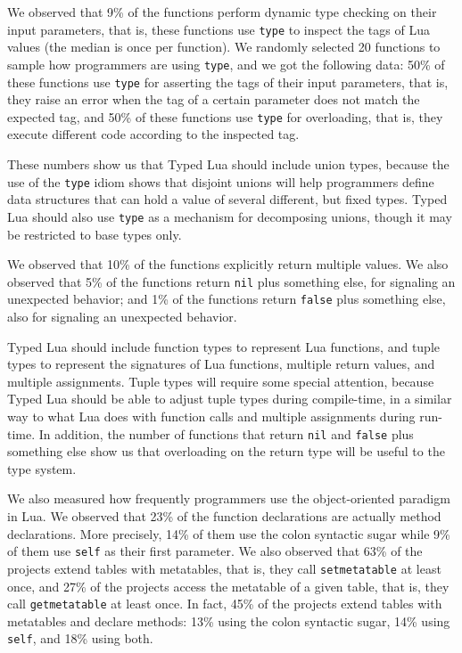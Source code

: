\documentclass[preprint]{sig-alternate}
\begin{document}
We observed that 9\% of the functions perform dynamic type checking
on their input parameters, that is, these functions use \texttt{type}
to inspect the tags of Lua values (the median is once per function).
We randomly selected 20 functions to sample how programmers are
using \texttt{type}, and we got the following data:
50\% of these functions use \texttt{type} for asserting the tags of
their input parameters, that is, they raise an error when the tag of a
certain parameter does not match the expected tag, and
50\% of these functions use \texttt{type} for overloading, that is,
they execute different code according to the inspected tag.

These numbers show us that Typed Lua should include union types,
because the use of the \texttt{type} idiom shows that disjoint unions
will help programmers define data structures that can hold a value of
several different, but fixed types.
Typed Lua should also use \texttt{type} as a mechanism for decomposing
unions, though it may be restricted to base types only.

We observed that 10\% of the functions explicitly return multiple
values.
We also observed that 5\% of the functions return \texttt{nil} plus
something else, for signaling an unexpected behavior;
and 1\% of the functions return \texttt{false} plus something else,
also for signaling an unexpected behavior.

Typed Lua should include function types to represent Lua functions,
and tuple types to represent the signatures of Lua functions,
multiple return values, and multiple assignments.
Tuple types will require some special attention, because Typed Lua
should be able to adjust tuple types during compile-time, in a
similar way to what Lua does with function calls and multiple
assignments during run-time.
In addition, the number of functions that return \texttt{nil} and
\texttt{false} plus something else show us that overloading on the
return type will be useful to the type system.

We also measured how frequently programmers use the object-oriented
paradigm in Lua.
We observed that 23\% of the function declarations are actually
method declarations.
More precisely, 14\% of them use the colon syntactic sugar while
9\% of them use \texttt{self} as their first parameter.
We also observed that 63\% of the projects extend tables with
metatables, that is, they call \texttt{setmetatable} at least once,
and 27\% of the projects access the metatable of a given table,
that is, they call \texttt{getmetatable} at least once.
In fact, 45\% of the projects extend tables with metatables and
declare methods:
13\% using the colon syntactic sugar, 14\% using \texttt{self}, and
18\% using both.
\end{document}
